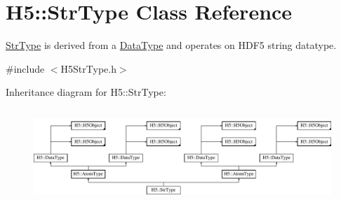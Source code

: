 \hypertarget{class_h5_1_1_str_type}{}\section{H5\+:\+:Str\+Type Class Reference}
\label{class_h5_1_1_str_type}


\hyperlink{class_h5_1_1_str_type}{Str\+Type} is derived from a \hyperlink{class_h5_1_1_data_type}{Data\+Type} and operates on H\+D\+F5 string datatype.  




{\ttfamily \#include $<$H5\+Str\+Type.\+h$>$}

Inheritance diagram for H5\+:\+:Str\+Type\+:\begin{figure}[H]
\begin{center}
\leavevmode
\includegraphics[height=3.571428cm]{class_h5_1_1_str_type}
\end{center}
\end{figure}
